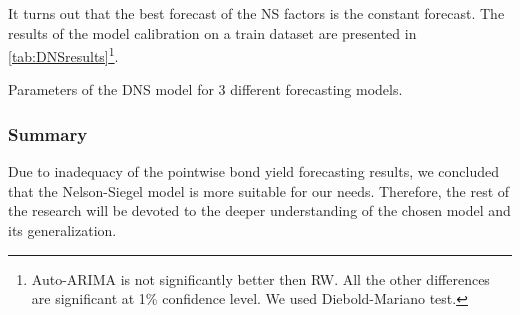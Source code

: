             It turns out that the best forecast of the NS factors is the constant forecast. The results of the model calibration on a train dataset are presented 
            in \cref{tab:DNSresults}\footnote{Auto-ARIMA is not significantly better then RW. 
            All the other differences are significant at 1\% confidence level. We used Diebold-Mariano test. }.
            \begin{table}[htbp]
                \centering
                
                \caption{Parameters of the DNS model for 3 different forecasting models.}
                \label{tab:DNSresults}
            \end{table}

        \subsubsection{Summary}
            Due to inadequacy of the pointwise bond yield forecasting results, we concluded that the Nelson-Siegel model is more suitable for our needs. Therefore, the rest of the research will be devoted to the deeper 
            understanding of the chosen model and its generalization.